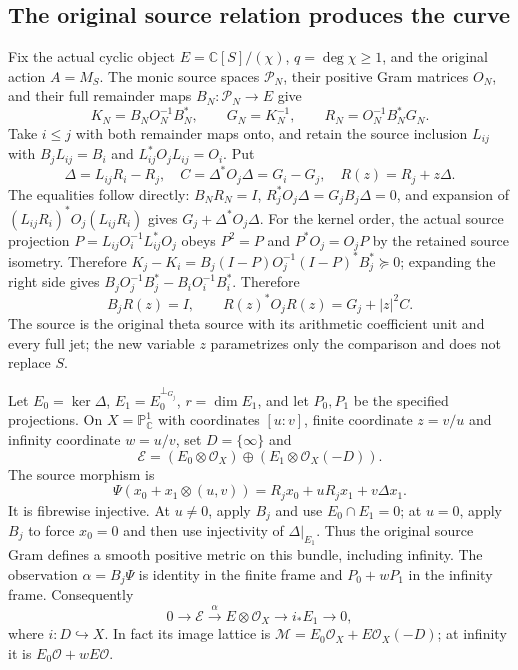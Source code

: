 \subsection{The original source relation produces the curve}

Fix the actual cyclic object $E=\mathbb C[S]/(\chi)$, $q=\deg\chi\geq1$,
and the original action $A=M_S$.  The monic source spaces
$\mathcal P_N$, their positive Gram matrices $O_N$, and their full
remainder maps $B_N:\mathcal P_N\to E$ give
\[
 K_N=B_NO_N^{-1}B_N^*,\qquad G_N=K_N^{-1},\qquad
 R_N=O_N^{-1}B_N^*G_N.
 \tag{DS12}
\]
Take $i\leq j$ with both remainder maps onto, and retain the source
inclusion $L_{ij}$ with
$B_jL_{ij}=B_i$ and $L_{ij}^*O_jL_{ij}=O_i$.  Put
\[
 \Delta=L_{ij}R_i-R_j,
 \quad C=\Delta^*O_j\Delta=G_i-G_j,
 \quad R(z)=R_j+z\Delta.
 \tag{DS13}
\]
The equalities follow directly: $B_NR_N=I$,
$R_j^*O_j\Delta=G_jB_j\Delta=0$, and expansion of
$(L_{ij}R_i)^*O_j(L_{ij}R_i)$ gives $G_j+\Delta^*O_j\Delta$.
For the kernel order, the actual source projection
$P=L_{ij}O_i^{-1}L_{ij}^*O_j$ obeys $P^2=P$ and
$P^*O_j=O_jP$ by the retained source isometry.  Therefore
$K_j-K_i=B_j(I-P)O_j^{-1}(I-P)^*B_j^*\succeq0$;
expanding the right side gives $B_jO_j^{-1}B_j^*-B_iO_i^{-1}B_i^*$.
Therefore
\[
 B_jR(z)=I,\qquad R(z)^*O_jR(z)=G_j+|z|^2C.
 \tag{DS14}
\]
The source is the original theta source with its arithmetic coefficient
unit and every full jet; the new variable $z$ parametrizes only the
comparison and does not replace $S$.

Let $E_0=\ker\Delta$, $E_1=E_0^{\perp_{G_j}}$, $r=\dim E_1$, and
let $P_0,P_1$ be the specified projections.  On
$X=\mathbb P^1_{\mathbb C}$ with coordinates $[u:v]$, finite coordinate
$z=v/u$ and infinity coordinate $w=u/v$, set $D=\{\infty\}$ and
\[
 \mathscr E=(E_0\otimes\mathcal O_X)
 \oplus(E_1\otimes\mathcal O_X(-D)).
 \tag{DS15}
\]
The source morphism is
\[
 \Psi(x_0+x_1\otimes(u,v))
 =R_jx_0+uR_jx_1+v\Delta x_1.
 \tag{DS16}
\]
It is fibrewise injective.  At $u\ne0$, apply $B_j$ and use
$E_0\cap E_1=0$; at $u=0$, apply $B_j$ to force $x_0=0$ and then
use injectivity of $\Delta|_{E_1}$.  Thus the original source Gram
defines a smooth positive metric on this bundle, including infinity.
The observation $\alpha=B_j\Psi$ is identity in the finite frame and
$P_0+wP_1$ in the infinity frame.  Consequently
\[
 0\to\mathscr E\xrightarrow{\alpha}E\otimes\mathcal O_X
 \to i_*E_1\to0,
 \tag{DS17}
\]
where $i:D\hookrightarrow X$.  In fact its image lattice is
$\mathcal M=E_0\mathcal O_X+E\mathcal O_X(-D)$; at infinity it is
$E_0\mathcal O+wE\mathcal O$.

